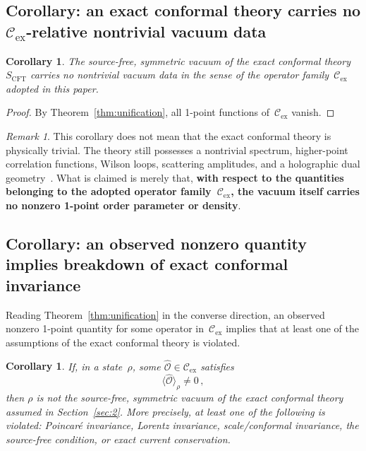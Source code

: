 \documentclass[
  aps,
  prd,
  preprint,
  groupedaddress,
  nofootinbib,
  longbibliography
]{revtex4-2}
\newtheorem{corollary}[definition]{Corollary}
\theoremstyle{remark}
\newtheorem{remark}[definition]{Remark}
\newcommand{\Cex}{\mathcal{C}_{\mathrm{ex}}}
\begin{document}
\subsection{Corollary: an exact conformal theory carries no
  \texorpdfstring{$\Cex$}{C\_ex}-relative nontrivial vacuum
  data}\label{subsec:5-3}

\begin{corollary}\label{cor:no-data}
The source-free, symmetric vacuum of the exact conformal
theory~$S_{\mathrm{CFT}}$ carries no nontrivial vacuum data
in the sense of the operator family~$\Cex$ adopted in this paper.
\end{corollary}

\begin{proof}
By Theorem~\ref{thm:unification}, all 1-point functions
of~$\Cex$ vanish.
\end{proof}

\begin{remark}\label{rem:not-trivial-theory}
This corollary does not mean that the exact conformal theory is
physically trivial.
The theory still possesses a nontrivial spectrum, higher-point
correlation functions, Wilson loops, scattering amplitudes, and
a holographic dual
geometry~\cite{ref1,ref2,ref3,ref4,ref5,ref6,ref7,ref9,ref10,
  ref11,ref12,ref13,ref14}.
What is claimed is merely that, \textbf{with respect to the
quantities belonging to the adopted operator family~$\Cex$, the
vacuum itself carries no nonzero 1-point order parameter or
density}.
\end{remark}

\subsection{Corollary: an observed nonzero quantity implies
  breakdown of exact conformal invariance}\label{subsec:5-4}

Reading Theorem~\ref{thm:unification} in the converse direction,
an observed nonzero 1-point quantity for some operator
in~$\Cex$ implies that at least one of the assumptions of the
exact conformal theory is violated.

\begin{corollary}\label{cor:converse}
If, in a state~$\rho$, some
$\hat{\mathcal{O}}\in\Cex$ satisfies
\begin{equation}\label{eq:converse}
  \langle\hat{\mathcal{O}}\rangle_\rho \neq 0\,,
\end{equation}
then $\rho$ is not the source-free, symmetric vacuum of the
exact conformal theory assumed in Section~\ref{sec:2}.
More precisely, at least one of the following is violated:
Poincar\'e invariance, Lorentz invariance, scale/conformal
invariance, the source-free condition, or exact current
conservation.
\end{corollary}
\end{document}
